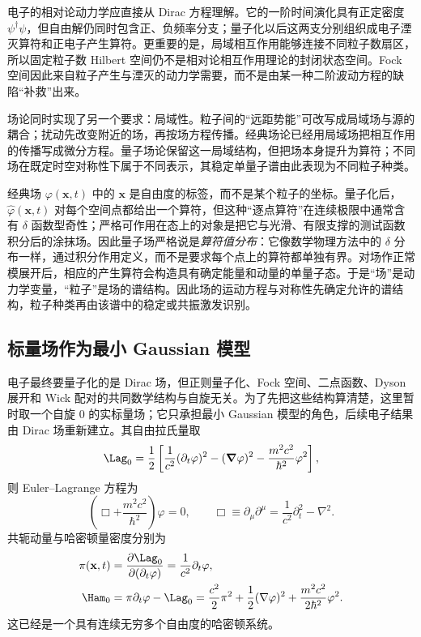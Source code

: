 电子的相对论动力学应直接从 Dirac 方程理解。它的一阶时间演化具有正定密度 $\psi^\dagger\psi$，但自由解仍同时包含正、负频率分支；量子化以后这两支分别组织成电子湮灭算符和正电子产生算符。更重要的是，局域相互作用能够连接不同粒子数扇区，所以固定粒子数 Hilbert 空间仍不是相对论相互作用理论的封闭状态空间。Fock 空间因此来自粒子产生与湮灭的动力学需要，而不是由某一种二阶波动方程的缺陷“补救”出来。

场论同时实现了另一个要求：局域性。粒子间的“远距势能”可改写成局域场与源的耦合；扰动先改变附近的场，再按场方程传播。经典场论已经用局域场把相互作用的传播写成微分方程。量子场论保留这一局域结构，但把场本身提升为算符；不同场在既定时空对称性下属于不同表示，其稳定单量子谱由此表现为不同粒子种类。

经典场 $\varphi(\mathbf x,t)$ 中的 $\mathbf x$ 是自由度的标签，而不是某个粒子的坐标。量子化后，$\hat\varphi(\mathbf x,t)$ 对每个空间点都给出一个算符，但这种“逐点算符”在连续极限中通常含有 $\delta$ 函数型奇性；严格可作用在态上的对象是把它与光滑、有限支撑的测试函数积分后的涂抹场。因此量子场严格说是\emph{算符值分布}：它像数学物理方法中的 $\delta$ 分布一样，通过积分作用定义，而不是要求每个点上的算符都单独有界。对场作正常模展开后，相应的产生算符会构造具有确定能量和动量的单量子态。于是“场”是动力学变量，“粒子”是场的谱结构。因此场的运动方程与对称性先确定允许的谱结构，粒子种类再由该谱中的稳定或共振激发识别。

\subsection{标量场作为最小 Gaussian 模型}

电子最终要量子化的是 Dirac 场，但正则量子化、Fock 空间、二点函数、Dyson 展开和 Wick 配对的共同数学结构与自旋无关。为了先把这些结构算清楚，这里暂时取一个自旋 $0$ 的实标量场；它只承担最小 Gaussian 模型的角色，后续电子结果由 Dirac 场重新建立。其自由拉氏量取
\begin{equation}
 \Lag_0
 =\frac12\left[
 \frac{1}{c^2}(\partial_t\varphi)^2
 -(\boldsymbol\nabla\varphi)^2
 -\frac{m^2c^2}{\hbar^2}\varphi^2
 \right],
 \label{eq:kg-lagrangian-r2}
\end{equation}
则 Euler--Lagrange 方程为
\begin{equation}
 \left(\Box+\frac{m^2c^2}{\hbar^2}\right)\varphi=0,
 \qquad
 \Box\equiv\partial_\mu\partial^\mu
 =\frac1{c^2}\partial_t^2-\nabla^2.
 \label{eq:kg-eom-r2}
\end{equation}
共轭动量与哈密顿量密度分别为
\begin{align}
 \pi(\mathbf x,t)
 &=\frac{\partial\Lag_0}{\partial(\partial_t\varphi)}
 =\frac1{c^2}\partial_t\varphi,
 \label{eq:kg-pi-r2}\\
 \Ham_0
 &=\pi\partial_t\varphi-\Lag_0
 =\frac{c^2}{2}\pi^2
 +\frac12(\nabla\varphi)^2
 +\frac{m^2c^2}{2\hbar^2}\varphi^2.
 \label{eq:kg-H-density-r2}
\end{align}
这已经是一个具有连续无穷多个自由度的哈密顿系统。

